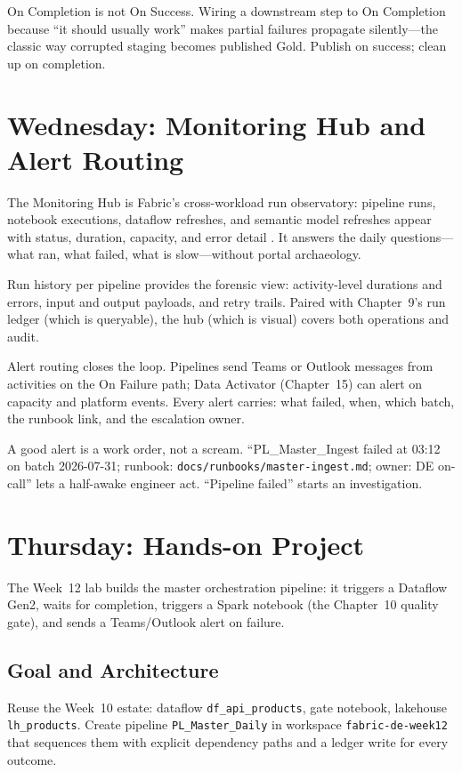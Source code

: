 \begin{pitfall}
On Completion is not On Success. Wiring a downstream step to On Completion because ``it should usually work'' makes partial failures propagate silently---the classic way corrupted staging becomes published Gold. Publish on success; clean up on completion.
\end{pitfall}

\section{Wednesday: Monitoring Hub and Alert Routing}
The Monitoring Hub is Fabric's cross-workload run observatory: pipeline runs, notebook executions, dataflow refreshes, and semantic model refreshes appear with status, duration, capacity, and error detail \cite{microsoftFabricMonitoringHub}. It answers the daily questions---what ran, what failed, what is slow---without portal archaeology.

Run history per pipeline provides the forensic view: activity-level durations and errors, input and output payloads, and retry trails. Paired with Chapter~9's run ledger (which is queryable), the hub (which is visual) covers both operations and audit.

Alert routing closes the loop. Pipelines send Teams or Outlook messages from activities on the On Failure path; Data Activator (Chapter~15) can alert on capacity and platform events. Every alert carries: what failed, when, which batch, the runbook link, and the escalation owner.

\begin{notebox}
A good alert is a work order, not a scream. ``PL\_Master\_Ingest failed at 03:12 on batch 2026-07-31; runbook: \texttt{docs/runbooks/master-ingest.md}; owner: DE on-call'' lets a half-awake engineer act. ``Pipeline failed'' starts an investigation.
\end{notebox}

\section{Thursday: Hands-on Project}
The Week~12 lab builds the master orchestration pipeline: it triggers a Dataflow Gen2, waits for completion, triggers a Spark notebook (the Chapter~10 quality gate), and sends a Teams/Outlook alert on failure.

\subsection{Goal and Architecture}
Reuse the Week~10 estate: dataflow \texttt{df\_api\_products}, gate notebook, lakehouse \texttt{lh\_products}. Create pipeline \texttt{PL\_Master\_Daily} in workspace \texttt{fabric-de-week12} that sequences them with explicit dependency paths and a ledger write for every outcome.


